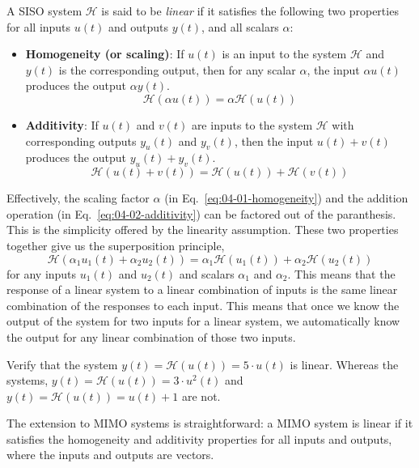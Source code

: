 A SISO system $\mathcal{H}$ is said to be \textit{linear} if it satisfies the following two properties for all inputs $u(t)$ and outputs $y(t)$, and all scalars $\alpha$:
\begin{itemize}
    \item \textbf{Homogeneity (or scaling)}: If $u(t)$ is an input to the system $\mathcal{H}$ and $y(t)$ is the corresponding output, then for any scalar $\alpha$, the input $\alpha u(t)$ produces the output $\alpha y(t)$.
    \begin{equation}
        \mathcal{H}(\alpha u(t)) = \alpha \mathcal{H}(u(t))
        \label{eq:04-01-homogeneity}
    \end{equation}
    \item \textbf{Additivity}: If $u(t)$ and $v(t)$ are inputs to the system $\mathcal{H}$ with corresponding outputs $y_u(t)$ and $y_v(t)$, then the input $u(t) + v(t)$ produces the output $y_u(t) + y_v(t)$.
    \begin{equation}
        \mathcal{H}(u(t) + v(t)) = \mathcal{H}(u(t)) + \mathcal{H}(v(t))
        \label{eq:04-02-additivity}
    \end{equation}
\end{itemize}
Effectively, the scaling factor $\alpha$ (in Eq.~\ref{eq:04-01-homogeneity}) and the addition operation (in Eq.~\ref{eq:04-02-additivity}) can be factored out of the paranthesis. This is the simplicity offered by the linearity assumption. These two properties together give us the superposition principle,
\begin{equation}
    \mathcal{H}(\alpha_1 u_1(t) + \alpha_2 u_2(t)) = \alpha_1 \mathcal{H}(u_1(t)) + \alpha_2 \mathcal{H}(u_2(t))
    \label{eq:04-03-superposition}
\end{equation}
for any inputs $u_1(t)$ and $u_2(t)$ and scalars $\alpha_1$ and $\alpha_2$. This means that the response of a linear system to a linear combination of inputs is the same linear combination of the responses to each input. This means that once we know the output of the system for two inputs for a linear system, we automatically know the output for any linear combination of those two inputs.

\begin{boxedstuff}
    \begin{problem}
        Verify that the system $y(t) = \mathcal{H}\left(u(t)\right) = 5 \cdot u(t)$ is linear. Whereas the systems, $y(t) = \mathcal{H}\left(u(t)\right) = 3 \cdot u^2(t)$ and $y(t) = \mathcal{H}\left(u(t)\right) = u(t) + 1$ are not.
    \end{problem}
\end{boxedstuff}
The extension to MIMO systems is straightforward: a MIMO system is linear if it satisfies the homogeneity and additivity properties for all inputs and outputs, where the inputs and outputs are vectors.

